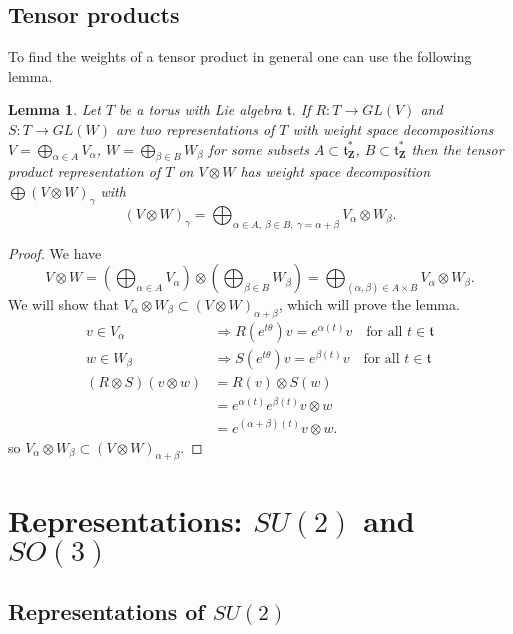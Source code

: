 \documentclass[12pt]{article}
\newcommand{\ZZ}{\mathbf{Z}}
\newtheorem{lma}[thm]{Lemma}
\theoremstyle{definition}
\theoremstyle{check}
\theoremstyle{remark}
\theoremstyle{TheoremNum}
\begin{document}
\subsection{Tensor products}

To find the weights of a tensor product in general one can use the following lemma.

\begin{lma}
Let $T$ be a torus with Lie algebra $\mathfrak{t}$. If $R\colon T\to GL(V)$ and $S\colon T\to GL(W)$ are two representations of $T$ with weight space decompositions $V=\bigoplus_{\alpha\in A} V_{\alpha}$, $W=\bigoplus_{\beta\in B} W_{\beta}$ for some subsets $A\subset\mathfrak{t}_{\ZZ}^*$, $B\subset\mathfrak{t}_{\ZZ}^*$ then the tensor product representation of $T$ on $V\otimes W$ has weight space decomposition $\bigoplus (V\otimes W)_{\gamma}$ with
\[(V\otimes W)_{\gamma}=\bigoplus_{\alpha\in A,\ \beta\in B,\ \gamma=\alpha+\beta}V_{\alpha}\otimes W_{\beta}.\]
\end{lma}
\begin{proof}
We have
\[V\otimes W=\left(\bigoplus_{\alpha\in A}V_{\alpha}\right)\otimes\left(\bigoplus_{\beta\in B}W_{\beta}\right)=\bigoplus_{(\alpha,\beta)\in A\times B}V_{\alpha}\otimes W_{\beta}.\]
We will show that $V_{\alpha}\otimes W_{\beta}\subset (V\otimes W)_{\alpha+\beta}$, which will prove the lemma.
\begin{align*}
v\in V_{\alpha}&\Rightarrow R(e^{t\theta})v=e^{\alpha(t)}v\quad\mbox{for all }t\in \mathfrak{t}\\
w\in W_{\beta}&\Rightarrow S(e^{t\theta})v=e^{\beta(t)}v\quad\mbox{for all }t\in \mathfrak{t}\\
(R\otimes S)(v\otimes w)&=R(v)\otimes S(w)\\
                        &=e^{\alpha(t)}e^{\beta(t)}v\otimes w\\
                        &=e^{(\alpha+\beta)(t)}v\otimes w.
\end{align*}
so $V_{\alpha}\otimes W_{\beta}\subset (V\otimes W)_{\alpha+\beta}$.
\end{proof}


\section{Representations: \texorpdfstring{$SU(2)$}{SU(2)} and \texorpdfstring{$SO(3)$}{SO(3)}}

\subsection{Representations of \texorpdfstring{$SU(2)$}{SU(2)}}
\end{document}
